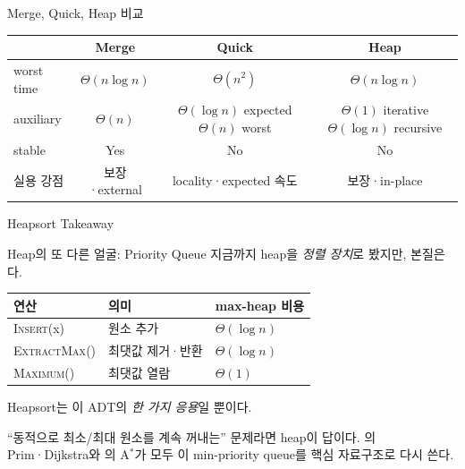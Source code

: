 \begin{frame}{Merge, Quick, Heap 비교}
\small\begin{tabular}{lccc}\toprule&Merge&Quick&Heap\\\midrule worst time&$\Theta(n\log n)$&$\Theta(n^2)$&$\Theta(n\log n)$\\auxiliary&$\Theta(n)$&\shortstack{$\Theta(\log n)$ expected\\$\Theta(n)$ worst}&\shortstack{$\Theta(1)$ iterative\\$\Theta(\log n)$ recursive}\\stable&Yes&No&No\\실용 강점&보장·external&locality·expected 속도&보장·in-place\\\bottomrule\end{tabular}
\end{frame}
\begin{frame}{Heapsort Takeaway}
\end{frame}
\begin{frame}{Heap의 또 다른 얼굴: Priority Queue}
지금까지 heap을 \emph{정렬 장치}로 봤지만, 본질은 다.
\begin{center}
\begin{tabular}{lll}\toprule
연산 & 의미 & max-heap 비용\\\midrule
\textsc{Insert}(x)      & 원소 추가            & \(\Theta(\log n)\)\\
\textsc{ExtractMax}()   & 최댓값 제거·반환      & \(\Theta(\log n)\)\\
\textsc{Maximum}()      & 최댓값 열람          & \(\Theta(1)\)\\
\bottomrule
\end{tabular}
\end{center}
Heapsort는 이 ADT의 \emph{한 가지 응용}일 뿐이다.
\begin{takeaway}``동적으로 최소/최대 원소를 계속 꺼내는'' 문제라면 heap이 답이다. 의 Prim·Dijkstra와 의 A\(^*\)가 모두 이 min-priority queue를 핵심 자료구조로 다시 쓴다.\end{takeaway}
\end{frame}
